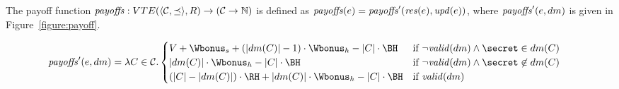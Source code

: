 



%
The payoff function $\mathit{payoffs}: VTE(\langle \mathcal{C},\preceq \rangle,R) \to (\mathcal{C} \to \mathbb{N})$ is defined as $\mathit{payoffs}(e) = \mathit{payoffs}'(\mathit{res}(e), \mathit{upd}(e))$, where $\mathit{payoffs}'(e,dm)$ is given in Figure~\ref{figure:payoff}.
\begin{figure*}
\begin{align*}
	\payoffs'(e,dm)& = \lambda C \in \coalitionSchema. \begin{cases}
 		V + \Wbonus_s + (|dm(C)| -1) \cdot \Wbonus_h - |C| \cdot \BH & \text{if}\  \neg \valid{dm} \wedge \secret \in dm(C)\\
 		|dm(C)|\cdot \Wbonus_h - |C| \cdot \BH & \text{if}\  \neg \valid{dm} \wedge \secret \not\in dm(C)\\
 		(|C| - |dm(C)|) \cdot \RH + |dm(C)| \cdot \Wbonus_h - |C| \cdot \BH & \text{if}\  \valid{dm}
 	\end{cases}	
\end{align*}
\caption{Payoff function}\label{figure:payoff}
\end{figure*}

